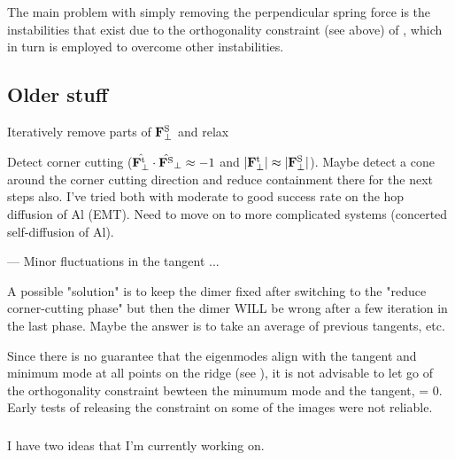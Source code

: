 The main problem with simply removing the perpendicular spring force is the instabilities that exist due to the orthogonality constraint (see above) of , which in turn is employed to overcome other instabilities.

\subsection{Older stuff}


\bit
\item Iteratively remove parts of ${\mathrm{\mathbf{\bm{F}}}}^\text{S}_\perp$ and relax
\item Detect corner cutting ($\hat{{\mathrm{\mathbf{\bm{F}}}}^\text{t}_\perp} \cdot \hat{{\mathrm{\mathbf{\bm{F}}}}^\text{S}}_\perp \approx -1$ and $|{\mathrm{\mathbf{\bm{F}}}}^\text{t}_\perp| \approx |{\mathrm{\mathbf{\bm{F}}}}^\text{S}_\perp|$). Maybe detect a cone around the corner cutting direction and reduce containment there for the next steps also.
\eit
I've tried both with moderate to good success rate on the hop diffusion of Al (EMT).
Need to move on to more complicated systems (concerted self-diffusion of Al).

--- Minor fluctuations in the tangent ... 

A possible "solution" is to keep the dimer fixed after switching to the "reduce corner-cutting phase" but then the dimer WILL be wrong after a few iteration in the last phase.
Maybe the answer is to take an average of previous tangents, etc.

Since there is no guarantee that the eigenmodes align with the tangent and minimum mode at all points on the ridge (see ), it is not advisable to let go of the orthogonality constraint bewteen the minumum mode and the tangent,
\uvn \cdot \uvt = 0.
\eeq
Early tests of releasing the constraint on some of the images were not reliable.

\incomplete

\subsubsection{}

I have two ideas that I'm currently working on.
